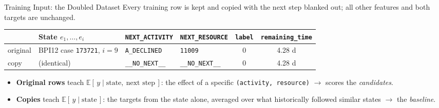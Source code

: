 \documentclass[aspectratio=169]{beamer} %
\begin{document}
\begin{frame}{Training Input: the Doubled Dataset}
  \small
  Every training row is kept \alert{and} copied with the next step blanked out;
  all other features and both targets are unchanged.
  \begin{center}
  \scriptsize
  \begin{tabular}{llllcc}
    \toprule
     & \textbf{State} $e_1,\dots,e_i$ & \texttt{NEXT\_ACTIVITY} & \texttt{NEXT\_RESOURCE} & \texttt{label} & \texttt{remaining\_time} \\
    \midrule
    original & BPI12 case \texttt{173721}, $i=9$ & \texttt{A\_DECLINED} & \texttt{11009} & 0 & 4.28 d \\
    copy     & (identical)                      & \texttt{\_\_NO\_NEXT\_\_} & \texttt{\_\_NO\_NEXT\_\_} & 0 & 4.28 d \\
    \bottomrule
  \end{tabular}
  \end{center}
  \footnotesize
  \begin{itemize}
    \item \textbf{Original rows} teach $\mathbb{E}[\,y \mid \text{state},\ \text{next step}\,]$:
      the effect of a specific \texttt{(activity, resource)} $\rightarrow$ scores the
      \emph{candidates}.
    \item \textbf{Copies} teach $\mathbb{E}[\,y \mid \text{state}\,]$: the targets from
      the state alone, averaged over what historically followed similar states
      $\rightarrow$ the \emph{baseline}.
  \end{itemize}
\end{frame}
\end{document}
